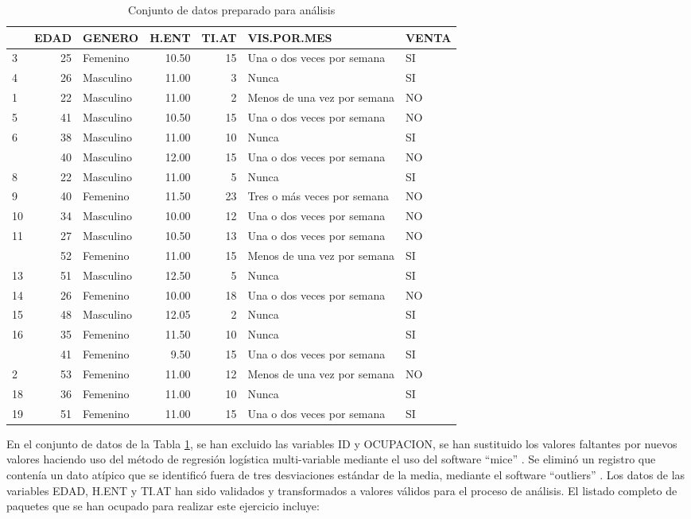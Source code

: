 \documentclass[]{book}
\begin{document}
\begin{table}

\caption{\label{tab:datos-listos}Conjunto de datos preparado para análisis}
\centering
\begin{tabular}[t]{lrlrrll}
\toprule
  & EDAD & GENERO & H.ENT & TI.AT & VIS.POR.MES & VENTA\\
\midrule
3 & 25 & Femenino & 10.50 & 15 & Una o dos veces por semana & SI\\
4 & 26 & Masculino & 11.00 & 3 & Nunca & SI\\
1 & 22 & Masculino & 11.00 & 2 & Menos de una vez por semana & NO\\
5 & 41 & Masculino & 10.50 & 15 & Una o dos veces por semana & NO\\
6 & 38 & Masculino & 11.00 & 10 & Nunca & SI\\
\addlinespace
7 & 40 & Masculino & 12.00 & 15 & Una o dos veces por semana & NO\\
8 & 22 & Masculino & 11.00 & 5 & Nunca & SI\\
9 & 40 & Femenino & 11.50 & 23 & Tres o más veces por semana & NO\\
10 & 34 & Masculino & 10.00 & 12 & Una o dos veces por semana & NO\\
11 & 27 & Masculino & 10.50 & 13 & Una o dos veces por semana & NO\\
\addlinespace
12 & 52 & Femenino & 11.00 & 15 & Menos de una vez por semana & SI\\
13 & 51 & Masculino & 12.50 & 5 & Nunca & SI\\
14 & 26 & Femenino & 10.00 & 18 & Una o dos veces por semana & NO\\
15 & 48 & Masculino & 12.05 & 2 & Nunca & SI\\
16 & 35 & Femenino & 11.50 & 10 & Nunca & SI\\
\addlinespace
17 & 41 & Femenino & 9.50 & 15 & Una o dos veces por semana & SI\\
2 & 53 & Femenino & 11.00 & 12 & Menos de una vez por semana & NO\\
18 & 36 & Femenino & 11.00 & 10 & Nunca & SI\\
19 & 51 & Femenino & 11.00 & 15 & Una o dos veces por semana & SI\\
\bottomrule
\end{tabular}
\end{table}

En el conjunto de datos de la Tabla \ref{tab:datos-listos}, se han
excluido las variables ID y OCUPACION, se han sustituido los valores
faltantes por nuevos valores haciendo uso del método de regresión
logística multi-variable mediante el uso del software ``mice''
\citep{R-mice}. Se eliminó un registro que contenía un dato atípico que
se identificó fuera de tres desviaciones estándar de la media, mediante
el software ``outliers'' \citep{R-outliers}. Los datos de las variables
EDAD, H.ENT y TI.AT han sido validados y transformados a valores válidos
para el proceso de análisis. El listado completo de paquetes que se han
ocupado para realizar este ejercicio incluye: \citep[\citet{R-magrittr},
\citet{R-RCurl}, \citet{R-bookdown} and \citet{R-rmarkdown}]{R-knitr}


\end{document}
